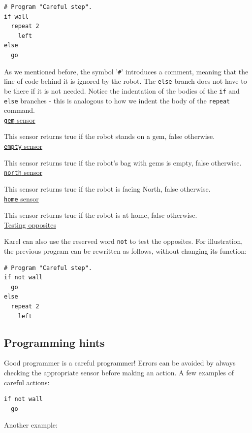 \documentclass[article,A4,12pt]{llncs}
\begin{document}
{{{{\begin{verbatim}
# Program "Careful step".
if wall
  repeat 2
    left
else
  go
\end{verbatim}
As we mentioned before, the symbol '{\tt \#}' introduces a comment, meaning that the line 
of code behind it is ignored by the robot.
The {\tt else} branch does not have to be there if it is not needed. Notice the indentation 
of the bodies of the {\tt if} and {\tt else} branches - this is analogous 
to how we indent the body of the {\tt repeat} command.\\

\noindent
\underline{{\tt gem} sensor}

This sensor returns true if the robot stands on a gem, false otherwise. \\

\noindent
\underline{{\tt empty} sensor}

This sensor returns true if the robot's bag with gems is empty, false otherwise. \\

\noindent
\underline{{\tt north} sensor}

This sensor returns true if the robot is facing North, false otherwise.\\

\noindent
\underline{{\tt home} sensor}

This sensor returns true if the robot is at home, false otherwise.\\

\noindent
\underline{Testing opposites}

Karel can also use the reserved word {\tt not} to test the opposites.
For illustration, the previous program can be rewritten as follows, without changing its function:
\begin{verbatim}
# Program "Careful step".
if not wall
  go
else
  repeat 2
    left
\end{verbatim}

\subsection{Programming hints}

Good programmer is a careful programmer! Errors can be avoided by always checking the 
appropriate sensor before making an action. A few examples of careful actions:
 
\begin{verbatim}
if not wall
  go
\end{verbatim}
Another example:
 
}}}}
\end{document}
